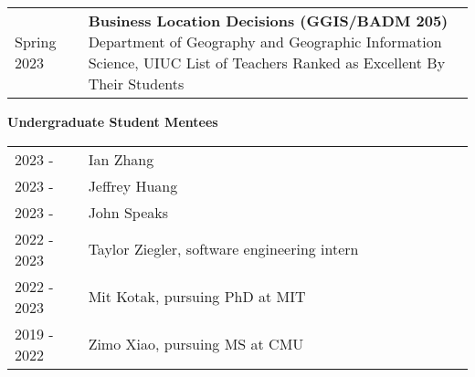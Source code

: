 \documentclass{acmcv}
\begin{document}
    \begin{longtable}{p{0.16\linewidth} p{0.84\linewidth}}
        Spring 2023 & \textbf{Business Location Decisions (GGIS/BADM 205)} \newline Department of Geography and Geographic Information Science, UIUC \newline
        List of Teachers Ranked as Excellent By Their Students \\

    \end{longtable}
    \textbf{Undergraduate Student Mentees}
    \vspace*{-0.25cm}
    \begin{longtable}{p{0.16\linewidth} p{0.84\linewidth}}
        2023 - & Ian Zhang\\
    
        2023 - & Jeffrey Huang\\
    
        2023 - & John Speaks\\
    
        2022 - 2023 & Taylor Ziegler, software engineering intern\\
    
        2022 - 2023 & Mit Kotak, pursuing PhD at MIT\\

        2019 - 2022 & Zimo Xiao, pursuing MS at CMU\\
    \end{longtable}


\end{document}
